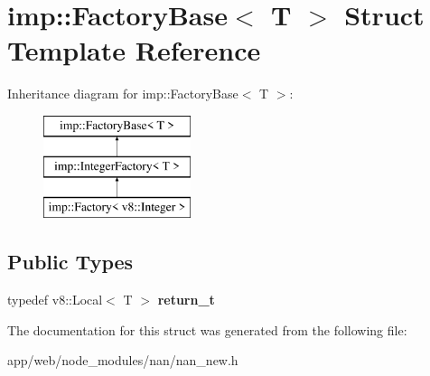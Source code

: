 \hypertarget{structimp_1_1_factory_base}{}\section{imp\+:\+:Factory\+Base$<$ T $>$ Struct Template Reference}
\label{structimp_1_1_factory_base}
Inheritance diagram for imp\+:\+:Factory\+Base$<$ T $>$\+:\begin{figure}[H]
\begin{center}
\leavevmode
\includegraphics[height=3.000000cm]{structimp_1_1_factory_base}
\end{center}
\end{figure}
\subsection*{Public Types}
\begin{DoxyCompactItemize}
\item 
\mbox{\label{structimp_1_1_factory_base_acdfe86a10f476e11cf7a449e1982983b}} 
typedef v8\+::\+Local$<$ T $>$ {\bfseries return\+\_\+t}
\end{DoxyCompactItemize}


The documentation for this struct was generated from the following file\+:\begin{DoxyCompactItemize}
\item 
app/web/node\+\_\+modules/nan/nan\+\_\+new.\+h\end{DoxyCompactItemize}
